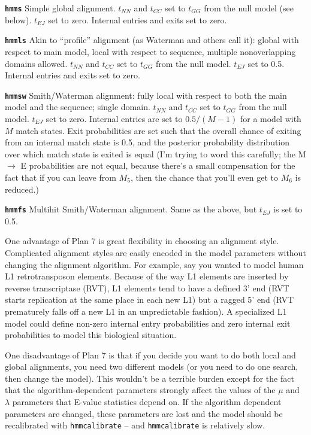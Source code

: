 \documentclass[11pt]{report}
\newenvironment{wideitem}{\begin{list} 
     {}
     { \setlength{\labelwidth}{2in}\setlength{\leftmargin}{1.5in}}}
     {\end{list}}
\newcommand{\prog}[1]{\texttt{#1}}
\newcommand{\emprog}[1]{{\bfseries\texttt{#1}}}
\begin{document}
\begin{wideitem}
\item [\emprog{hmms}] Simple global alignment. $t_{NN}$ and $t_{CC}$ set to
$t_{GG}$ from the null model (see below). $t_{EJ}$ set to
zero. Internal entries and exits set to zero.

\item [\emprog{hmmls}] Akin to ``profile'' alignment (as Waterman and others
call it): global with respect to main model, local with respect to
sequence, multiple nonoverlapping domains allowed. $t_{NN}$ and
$t_{CC}$ set to $t_{GG}$ from the null model. $t_{EJ}$ set to
0.5. Internal entries and exits set to zero.
 
\item [\emprog{hmmsw}] Smith/Waterman alignment: fully local with 
respect to both the main model and the sequence; single domain.
$t_{NN}$ and $t_{CC}$ set to $t_{GG}$ from the null model. $t_{EJ}$
set to zero. Internal entries are set to $0.5/(M-1)$ for a model with
$M$ match states. Exit probabilities are set such that the overall
chance of exiting from an internal match state is 0.5, and the
posterior probability distribution over which match state is exited is
equal (I'm trying to word this carefully; the M $\rightarrow$ E
probabilities are not equal, because there's a small compensation for
the fact that if you can leave from $M_5$, then the chance that you'll
even get to $M_6$ is reduced.)

\item [\emprog{hmmfs}] Multihit Smith/Waterman alignment. Same
as the above, but $t_{EJ}$ is set to 0.5.
\end{wideitem}


One advantage of Plan 7 is great flexibility in choosing an alignment
style. Complicated alignment styles are easily encoded in the model
parameters without changing the alignment algorithm.  For example, say
you wanted to model human L1 retrotransposon elements. Because of the
way L1 elements are inserted by reverse transcriptase (RVT), L1
elements tend to have a defined 3' end (RVT starts replication at the
same place in each new L1) but a ragged 5' end (RVT prematurely falls
off a new L1 in an unpredictable fashion). A specialized L1 model
could define non-zero internal entry probabilities and zero internal
exit probabilities to model this biological situation.

One disadvantage of Plan 7 is that if you decide you want to do both
local and global alignments, you need two different models (or you
need to do one search, then change the model). This wouldn't be a
terrible burden except for the fact that the algorithm-dependent
parameters strongly affect the values of the $\mu$ and $\lambda$
parameters that E-value statistics depend on. If the algorithm
dependent parameters are changed, these parameters are lost and the
model should be recalibrated with \prog{hmmcalibrate} -- and
\prog{hmmcalibrate} is relatively slow.
\end{document}

